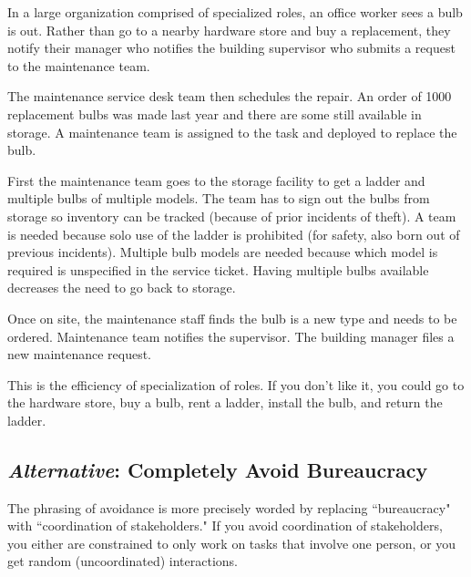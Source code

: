 \begin{mdframed}[frametitle={Changing a Lightbulb},frametitlerule=true,frametitlealignment=\centering]
In a large organization comprised of specialized roles, an office worker sees a bulb is out. Rather than go to a nearby hardware store and buy a replacement, they notify their manager who notifies the building supervisor who submits a request to the maintenance team. 

The maintenance service desk team then schedules the repair. An order of 1000 replacement bulbs was made last year and there are some still available in storage. A maintenance team is assigned to the task and deployed to replace the bulb. 

First the maintenance team goes to the storage facility to get a ladder and multiple bulbs of multiple models. The team has to sign out the bulbs from storage so inventory can be tracked (because of prior incidents of theft). A team is needed because solo use of the ladder is prohibited (for safety, also born out of previous incidents). Multiple bulb models are needed because which model is required is unspecified in the service ticket. Having multiple bulbs available decreases the need to go back to storage. 

Once on site, the maintenance staff finds the bulb is a new type and needs to be ordered. Maintenance team notifies the supervisor. The building manager files a new maintenance request.
\end{mdframed}

This is the efficiency of specialization of roles. If you don't like it, you could go to the hardware store, buy a bulb, rent a ladder, install the bulb, and return the ladder.


\subsection*{\textit{Alternative}: Completely Avoid Bureaucracy}
The phrasing of avoidance is more precisely worded by replacing ``bureaucracy" with ``coordination of stakeholders." If you avoid coordination of stakeholders, you either are constrained to only work on tasks that involve one person, or you get random (uncoordinated) interactions. 

